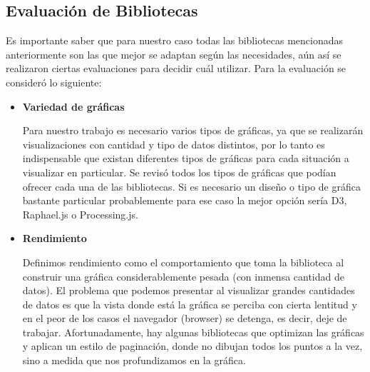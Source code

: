 \subsection{Evaluación de Bibliotecas}
Es importante saber que para nuestro caso todas las bibliotecas mencionadas anteriormente son las que mejor se adaptan según las necesidades, aún así se realizaron ciertas evaluaciones para decidir cuál utilizar. Para la evaluación se consideró lo siguiente:

\begin{itemize}
\item \textbf{Variedad de gráficas}

Para nuestro trabajo es necesario varios tipos de gráficas, ya que se realizarán visualizaciones con cantidad y tipo de datos distintos, por lo tanto es indispensable que existan diferentes tipos de gráficas para cada situación a visualizar en particular. Se revisó todos los tipos de gráficas que podían ofrecer cada una de las bibliotecas. Si es necesario un diseño o tipo de gráfica bastante particular probablemente para ese caso la mejor opción sería D3, Raphael.js o Processing.js.

\item \textbf{Rendimiento}

Definimos rendimiento como el comportamiento que toma la biblioteca al construir una gráfica considerablemente pesada (con inmensa cantidad de datos). El problema que podemos presentar al visualizar grandes cantidades de datos es que la vista donde está la gráfica se perciba con cierta lentitud y en el peor de los casos el navegador (browser) se detenga, es decir, deje de trabajar. Afortunadamente, hay algunas bibliotecas que optimizan las gráficas y aplican un estilo de paginación, donde no dibujan todos los puntos a la vez, sino a medida que nos profundizamos en la gráfica.


\end{itemize}
